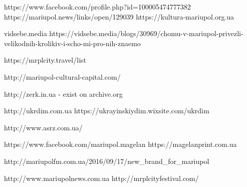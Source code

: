  
 
 
 
 

https://www.facebook.com/profile.php?id=100005474777382
https://mariupol.news/links/open/129039
https://kultura-mariupol.org.ua

vidsebe.media
https://vidsebe.media/blogs/30969/chomu-v-mariupol-privezli-velikodnih-krolikiv-i-scho-mi-pro-nih-znaemo

https://mrplcity.travel/list

http://mariupol-cultural-capital.com/

http://zerk.in.ua - exist on archive.org

http://ukrdim.com.ua
https://ukrayinskiydim.wixsite.com/ukrdim

http://www.asrz.com.ua/

https://www.facebook.com/mariupol.magelan
https://magelanprint.com.ua

http://mariupolfm.com.ua/2016/09/17/new_brand_for_mariupol

http://www.mariupolnews.com.ua
http://mrplcityfestival.com/


